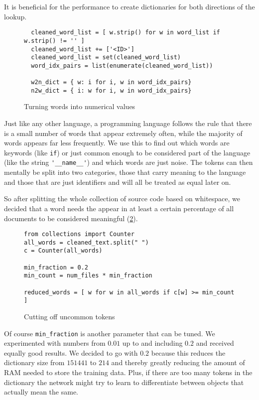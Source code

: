     It is beneficial for the performance to create dictionaries for both directions of the lookup.

    \begin{figure}[htpb]
      \centering
      \begin{lstlisting}
  cleaned_word_list = [ w.strip() for w in word_list if w.strip() != '' ]
  cleaned_word_list += ['<ID>']
  cleaned_word_list = set(cleaned_word_list)
  word_idx_pairs = list(enumerate(cleaned_word_list))

  w2n_dict = { w: i for i, w in word_idx_pairs}
  n2w_dict = { i: w for i, w in word_idx_pairs} \end{lstlisting}
      \caption{Turning words into numerical values}
      \label{fig:tonums}
    \end{figure}

    Just like any other language, a programming language follows the rule that there is a small number of words that
    appear extremely often, while the majority of words appears far less frequently. We use this to
    find out which words are keywords (like \verb+if+) or just common enough to be considered part of the language
    (like the string \verb+'__name__'+) and which words are just noise. The tokens can then mentally be split into
    two categories, those that carry meaning to the language and those that are just identifiers and will all be treated
    as equal later on.
  
    So after splitting the whole collection of source code based on whitespace, we decided that a word needs the appear
    in at least a certain percentage of all documents to be considered meaningful (\ref{fig:downsamp}).

    \begin{figure}[htpb]
      \centering
  \begin{lstlisting}
from collections import Counter
all_words = cleaned_text.split(" ")
c = Counter(all_words)

min_fraction = 0.2
min_count = num_files * min_fraction

reduced_words = [ w for w in all_words if c[w] >= min_count ] \end{lstlisting}
      \caption{Cutting off uncommon tokens}
      \label{fig:downsamp}
    \end{figure}

    Of course \verb+min_fraction+ is another parameter that can be tuned. We experimented with numbers 
    from $0.01$ up to and including $0.2$ and received equally good results. We decided to go with $0.2$ because this
    reduces the dictionary size from $151441$ to $214$ and thereby greatly reducing the amount of RAM needed
    to store the training data. Plus, if there are too many tokens in the dictionary the network might
    try to learn to differentiate between objects that actually mean the same.

